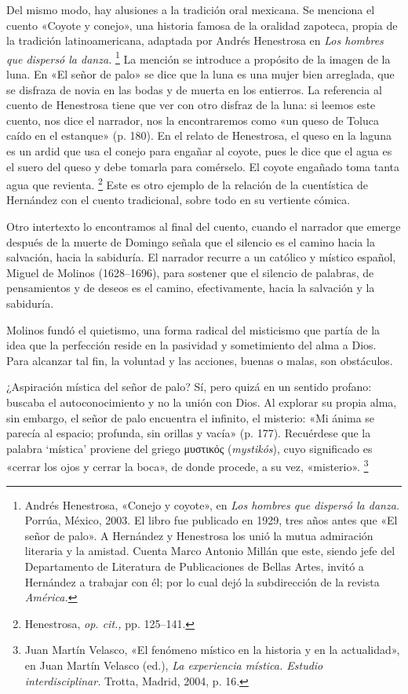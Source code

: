 \documentclass[14pt,twoside,final]{extbook} %
\let\oldfootnote\footnote
\renewcommand\footnote[1]{%
\oldfootnote{\hspace{1mm}#1}}
\begin{document}
Del mismo modo, hay alusiones a la tradición oral mexicana. Se menciona el cuento «Coyote y conejo», una historia famosa de la oralidad zapoteca, propia de la tradición latinoamericana, adaptada por Andrés Henestrosa en \emph{Los hombres que dispersó la danza.}\footnote{Andrés Henestrosa, «Conejo y coyote», en \emph{Los hombres que dispersó la danza.} Porrúa, México, 2003. El libro fue publicado en 1929, tres años antes que «El señor de palo». A Hernández y Henestrosa los unió la mutua admiración literaria y la amistad. Cuenta Marco Antonio Millán que este, siendo jefe del Departamento de Literatura de Publicaciones de Bellas Artes, invitó a Hernández a trabajar con él; por lo cual dejó la subdirección de la revista \emph{América.}} La mención se introduce a propósito de la imagen de la luna. En «El señor de palo» se dice que la luna es una mujer bien arreglada, que se disfraza de novia en las bodas y de muerta en los entierros. La referencia al cuento de Henestrosa tiene que ver con otro disfraz de la luna: si leemos este cuento, nos dice el narrador, nos la encontraremos como «un queso de Toluca caído en el estanque» (p. 180). En el relato de Henestrosa, el queso en la laguna es un ardid que usa el conejo para engañar al coyote, pues le dice que el agua es el suero del queso y debe tomarla para comérselo. El coyote engañado toma tanta agua que revienta.\footnote{Henestrosa, \emph{op. cit.,} pp. 125--141.} Este es otro ejemplo de la relación de la cuentística de Hernández con el cuento tradicional, sobre todo en su vertiente cómica.

Otro intertexto lo encontramos al final del cuento, cuando el narrador que emerge después de la muerte de Domingo señala que el silencio es el camino hacia la salvación, hacia la sabiduría. El narrador recurre a un católico y místico español, Miguel de Molinos (1628--1696), para sostener que el silencio de palabras, de pensamientos y de deseos es el camino, efectivamente, hacia la salvación y la sabiduría.

Molinos fundó el quietismo, una forma radical del misticismo que partía de la idea que la perfección reside en la pasividad y sometimiento del alma a Dios. Para alcanzar tal fin, la voluntad y las acciones, buenas o malas, son obstáculos.

¿Aspiración mística del señor de palo? Sí, pero quizá en un sentido profano: buscaba el autoconocimiento y no la unión con Dios. Al explorar su propia alma, sin embargo, el señor de palo encuentra el infinito, el misterio: «Mi ánima se parecía al espacio; profunda, sin orillas y vacía» (p. 177). Recuérdese que la palabra `mística' proviene del griego \textgreek{μυστικός} (\emph{mystikós}), cuyo significado es «cerrar los ojos y cerrar la boca», de donde procede, a su vez, «misterio».\footnote{Juan Martín Velasco, «El fenómeno místico en la historia y en la actualidad», en Juan Martín Velasco (ed.), \emph{La experiencia mística. Estudio interdisciplinar.} Trotta, Madrid, 2004, p. 16.}
\end{document}
